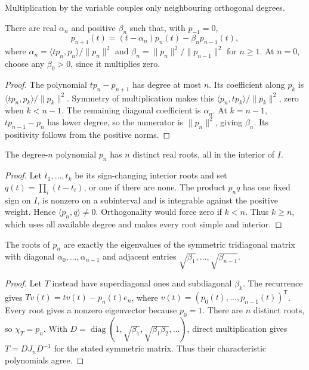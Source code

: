 Multiplication by the variable couples only neighbouring orthogonal degrees.
\begin{theorem}\label{linear:thm:recurrence}
There are real $\alpha_n$ and positive $\beta_n$ such that, with $p_{-1}=0$,
\[p_{n+1}(t)=(t-\alpha_n)p_n(t)-\beta_np_{n-1}(t),\]
where $\alpha_n=\langle tp_n,p_n\rangle/\|p_n\|^2$ and $\beta_n=\|p_n\|^2/\|p_{n-1}\|^2$ for $n\ge1$. At $n=0$, choose any $\beta_0>0$, since it multiplies zero.
\end{theorem}
\begin{proof}
The polynomial $tp_n-p_{n+1}$ has degree at most $n$. Its coefficient along $p_k$ is $\langle tp_n,p_k\rangle/\|p_k\|^2$. Symmetry of multiplication makes this $\langle p_n,tp_k\rangle/\|p_k\|^2$, zero when $k<n-1$. The remaining diagonal coefficient is $\alpha_n$. At $k=n-1$, $tp_{n-1}-p_n$ has lower degree, so the numerator is $\|p_n\|^2$, giving $\beta_n$. Its positivity follows from the positive norms.
\end{proof}

\begin{theorem}[zeros]\label{linear:thm:zeros}
The degree-$n$ polynomial $p_n$ has $n$ distinct real roots, all in the interior of $I$.
\end{theorem}
\begin{proof}
Let $t_1,\ldots,t_k$ be its sign-changing interior roots and set $q(t)=\prod_i(t-t_i)$, or one if there are none. The product $p_nq$ has one fixed sign on $I$, is nonzero on a subinterval and is integrable against the positive weight. Hence $\langle p_n,q\rangle\ne0$. Orthogonality would force zero if $k<n$. Thus $k\ge n$, which uses all available degree and makes every root simple and interior.
\end{proof}

\begin{proposition}\label{linear:prop:jacobi}
The roots of $p_n$ are exactly the eigenvalues of the symmetric tridiagonal matrix with diagonal $\alpha_0,\ldots,\alpha_{n-1}$ and adjacent entries $\sqrt{\beta_1},\ldots,\sqrt{\beta_{n-1}}$.
\end{proposition}
\begin{proof}
Let $T$ instead have superdiagonal ones and subdiagonal $\beta_k$. The recurrence gives $Tv(t)=tv(t)-p_n(t)e_n$, where $v(t)=(p_0(t),\ldots,p_{n-1}(t))^{\mathsf T}$. Every root gives a nonzero eigenvector because $p_0=1$. There are $n$ distinct roots, so $\chi_T=p_n$. With $D=\operatorname{diag}(1,\sqrt{\beta_1},\sqrt{\beta_1\beta_2},\ldots)$, direct multiplication gives $T=DJ_nD^{-1}$ for the stated symmetric matrix. Thus their characteristic polynomials agree.
\end{proof}

